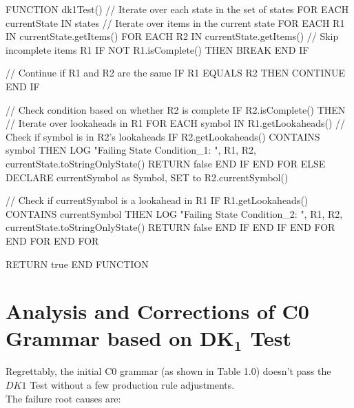 \begin{codeblock}
    FUNCTION dk1Test()
    // Iterate over each state in the set of states
    FOR EACH currentState IN states
    // Iterate over items in the current state
    FOR EACH R1 IN currentState.getItems()
    FOR EACH R2 IN currentState.getItems()
    // Skip incomplete items R1
    IF NOT R1.isComplete() THEN
    BREAK
    END IF

    // Continue if R1 and R2 are the same
    IF R1 EQUALS R2 THEN
    CONTINUE
    END IF

    // Check condition based on whether R2 is complete
    IF R2.isComplete() THEN
    // Iterate over lookaheads in R1
    FOR EACH symbol IN R1.getLookaheads()
    // Check if symbol is in R2's lookaheads
    IF R2.getLookaheads() CONTAINS symbol THEN
    LOG "Failing State Condition_1: ", R1, R2, currentState.toStringOnlyState()
    RETURN false
    END IF
    END FOR
    ELSE
    DECLARE currentSymbol as Symbol, SET to R2.currentSymbol()

    // Check if currentSymbol is a lookahead in R1
    IF R1.getLookaheads() CONTAINS currentSymbol THEN
    LOG "Failing State Condition_2: ", R1, R2, currentState.toStringOnlyState()
    RETURN false
    END IF
    END IF
    END FOR
    END FOR
    END FOR

    RETURN true
    END FUNCTION
\end{codeblock}

\newpage


\section{Analysis and Corrections of C0 Grammar based on \(\boldsymbol{DK_{1}}\) Test}\label{sec:DK1 Test}

Regrettably, the initial C0 grammar (as shown in Table 1.0) doesn’t pass the \(DK1\) Test without a few production rule adjustments.\\

The failure root causes are:

